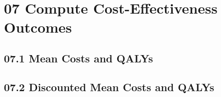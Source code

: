\documentclass[
]{article}
\newenvironment{Shaded}{\begin{snugshade}}{\end{snugshade}}
\newcommand{\CommentTok}[1]{\textcolor[rgb]{0.56,0.35,0.01}{\textit{#1}}}
\newcommand{\KeywordTok}[1]{\textcolor[rgb]{0.13,0.29,0.53}{\textbf{#1}}}
\newcommand{\NormalTok}[1]{#1}
\newcommand{\OperatorTok}[1]{\textcolor[rgb]{0.81,0.36,0.00}{\textbf{#1}}}
\newcommand{\StringTok}[1]{\textcolor[rgb]{0.31,0.60,0.02}{#1}}
\begin{document}
\hypertarget{compute-cost-effectiveness-outcomes}{%
\section{07 Compute Cost-Effectiveness
Outcomes}\label{compute-cost-effectiveness-outcomes}}

\hypertarget{mean-costs-and-qalys}{%
\subsection{07.1 Mean Costs and QALYs}\label{mean-costs-and-qalys}}

\begin{Shaded}
\end{Shaded}

\hypertarget{discounted-mean-costs-and-qalys}{%
\subsection{07.2 Discounted Mean Costs and
QALYs}\label{discounted-mean-costs-and-qalys}}
\end{document}
